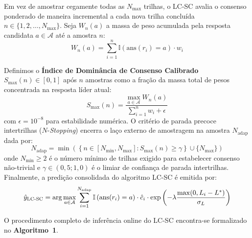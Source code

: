 \documentclass[9pt,conference]{IEEEtran}
\begin{document}
Em vez de amostrar cegamente todas as $N_{\max}$ trilhas, o LC-SC avalia o consenso ponderado de maneira incremental a cada nova trilha conclu\'{i}da $n \in \{1, 2, \dots, N_{\max}\}$. Seja $W_n(a)$ a massa de peso acumulada pela resposta candidata $a \in \mathcal{A}$ at\'{e} a amostra $n$:
\begin{equation}
W_n(a) = \sum_{i=1}^{n} \mathbb{I}\left(\text{ans}(r_i) = a\right) \cdot w_i
\label{eq:accumulated_weight}
\end{equation}

Definimos o \textbf{\'{I}ndice de Domin\^{a}ncia de Consenso Calibrado} $S_{\max}(n) \in [0, 1]$ ap\'{o}s $n$ amostras como a fra\c{c}\~{a}o da massa total de pesos concentrada na resposta l\'{i}der atual:
\begin{equation}
S_{\max}(n) = \frac{\max_{a \in \mathcal{A}} W_n(a)}{\sum_{i=1}^{n} w_i + \epsilon}
\label{eq:dominance_ratio}
\end{equation}
com $\epsilon = 10^{-8}$ para estabilidade num\'{e}rica. O crit\'{e}rio de parada precoce intertrilhas ($N$-\textit{Stopping}) encerra o la\c{c}o externo de amostragem na amostra $N_{\text{adap}}$ dada por:
\begin{equation}
N_{\text{adap}} = \min \left( \left\{ n \in [N_{\min}, N_{\max}] : S_{\max}(n) \ge \gamma \right\} \cup \{N_{\max}\} \right)
\label{eq:n_stopping}
\end{equation}
onde $N_{\min} \ge 2$ \'{e} o n\'{u}mero m\'{i}nimo de trilhas exigido para estabelecer consenso n\~{a}o-trivial e $\gamma \in (0,5; 1,0)$ \'{e} o limiar de confian\c{c}a de parada intertrilhas. Finalmente, a predi\c{c}\~{a}o consolidada do algoritmo LC-SC \'{e} emitida por:
\begin{equation}
\resizebox{0.88\columnwidth}{!}{$\displaystyle \hat{y}_{\text{LC-SC}} = \arg\max_{a \in \mathcal{A}} \sum_{i=1}^{N_{\text{adap}}} \mathbb{I}\left(\text{ans}(r_i) = a\right) \cdot \hat{c}_i \cdot \exp\left( -\lambda \frac{\max(0, L_i - L^*)}{\sigma_L} \right)$}
\label{eq:final_lc_sc_decision}
\end{equation}

O procedimento completo de infer\^{e}ncia online do LC-SC encontra-se formalizado no \textbf{Algoritmo~1}.
\end{document}
